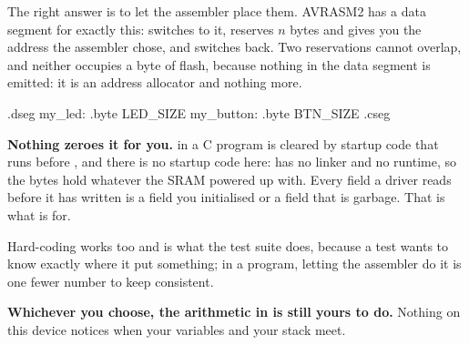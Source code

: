 The right answer is to let the assembler place them. AVRASM2 has a data segment for exactly this:
 switches to it,  reserves $n$ bytes and gives you the address the
assembler chose, and  switches back. Two reservations cannot overlap, and neither
occupies a byte of flash, because nothing in the data segment is emitted: it is an address
allocator and nothing more.

\begin{asm}
.dseg
my_led:     .byte LED_SIZE
my_button:  .byte BTN_SIZE
.cseg
\end{asm}

\textbf{Nothing zeroes it for you.}  in a C program is cleared by startup code that runs
before , and there is no startup code here:  has no linker and no runtime, so
the bytes hold whatever the SRAM powered up with. Every field a driver reads before it has written
is a field you initialised or a field that is garbage. That is what  is for.

Hard-coding  works too and is what the test suite does, because a test wants to know
exactly where it put something; in a program, letting the assembler do it is one fewer number to
keep consistent.

\textbf{Whichever you choose, the arithmetic in  is still yours to do.}
Nothing on this device notices when your variables and your stack meet.
